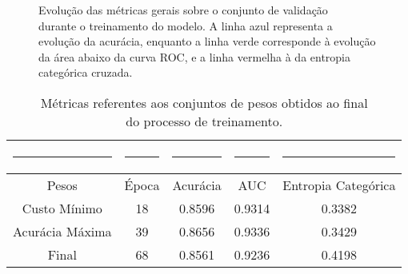 \begin{figure}[ht]
    \centering
    \caption{Evolução das métricas gerais sobre o conjunto de validação\\ durante o treinamento do modelo. A linha azul representa a evolução da acurácia, enquanto a linha verde corresponde à evolução da área abaixo da curva ROC, e a linha vermelha à da entropia categórica cruzada.}
    \label{fig:general-metrics-val}
\end{figure}

\begin{table}[ht]
    \centering
    \begin{tabular}{|c|c|c|c|c|}
        \rule{1cm}{0pt}&\rule{1.5cm}{0pt}&\rule{1.5cm}{0pt}&\rule{1.5cm}{0pt}&\rule{1cm}{0pt}\\[-\arraystretch\normalbaselineskip]
        \hline
        Pesos & Época & Acurácia & AUC & Entropia Categórica \\
        \hline
        \hline
        Custo Mínimo & 18 & 0.8596 & 0.9314 & 0.3382 \\
        \hline
        Acurácia Máxima & 39 & 0.8656 & 0.9336 & 0.3429 \\
        \hline
        Final & 68 & 0.8561 & 0.9236 & 0.4198 \\
        \hline
    \end{tabular}
    \caption{Métricas referentes aos conjuntos de pesos obtidos ao final\\ do processo de treinamento.}
    \label{tab:general-metrics-val}
\end{table}

